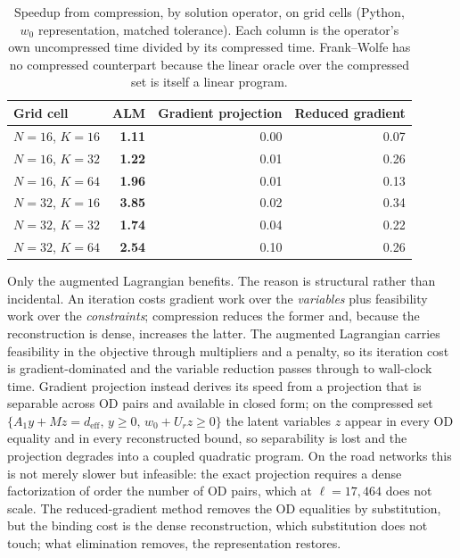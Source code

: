 \documentclass[11pt]{article}
\begin{document}
\begin{table}[h]
\centering
\caption{Speedup from compression, by solution operator, on grid cells
(Python, $w_0$ representation, matched tolerance). Each column is the operator's own
uncompressed time divided by its compressed time. Frank--Wolfe has no compressed counterpart
because the linear oracle over the compressed set is itself a linear program.}
\label{tab:operator-compression}
{\small
\begin{tabular}{lrrr}
\toprule
Grid cell & ALM & Gradient projection & Reduced gradient\\
\midrule
$N=16$, $K=16$ & \textbf{1.11} & 0.00 & 0.07\\
$N=16$, $K=32$ & \textbf{1.22} & 0.01 & 0.26\\
$N=16$, $K=64$ & \textbf{1.96} & 0.01 & 0.13\\
$N=32$, $K=16$ & \textbf{3.85} & 0.02 & 0.34\\
$N=32$, $K=32$ & \textbf{1.74} & 0.04 & 0.22\\
$N=32$, $K=64$ & \textbf{2.54} & 0.10 & 0.26\\
\bottomrule
\end{tabular}}
\end{table}

Only the augmented Lagrangian benefits. The reason is structural rather than incidental. An
iteration costs gradient work over the \emph{variables} plus feasibility work over the
\emph{constraints}; compression reduces the former and, because the reconstruction is dense,
increases the latter. The augmented Lagrangian carries feasibility in the objective through
multipliers and a penalty, so its iteration cost is gradient-dominated and the variable
reduction passes through to wall-clock time. Gradient projection instead derives its speed
from a projection that is separable across OD pairs and available in closed form; on the
compressed set $\{A_1y+Mz=d_{\mathrm{eff}},\,y\ge0,\,w_0+U_rz\ge0\}$ the latent variables
$z$ appear in every OD equality and in every reconstructed bound, so separability is lost and
the projection degrades into a coupled quadratic program. On the road networks this is not
merely slower but infeasible: the exact projection requires a dense factorization of order
the number of OD pairs, which at $\ell=17{,}464$ does not scale. The reduced-gradient method
removes the OD equalities by substitution, but the binding cost is the dense reconstruction,
which substitution does not touch; what elimination removes, the representation restores.
\end{document}
